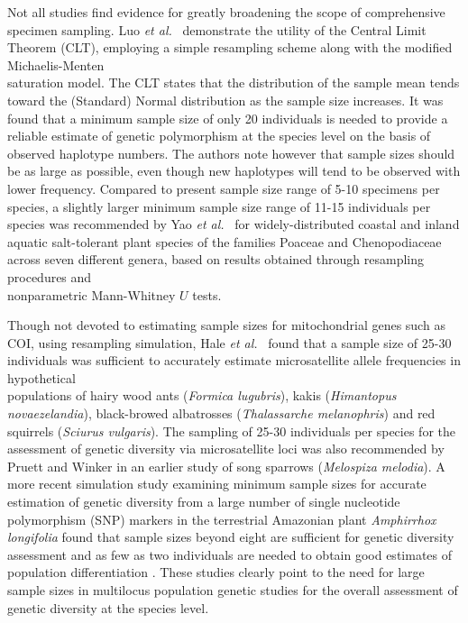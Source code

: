 Not all studies find evidence for greatly broadening the scope of comprehensive \\ specimen sampling. Luo \textit{et al.}~\cite{luo2015simulation} demonstrate the utility of the Central Limit Theorem (CLT), employing a simple resampling scheme along with the modified Michaelis-Menten \\ saturation model. The CLT states that the distribution of the sample mean tends toward the (Standard) Normal distribution as the sample size increases. It was found that a minimum sample size of only 20 individuals is needed to provide a reliable estimate of genetic polymorphism at the species level on the basis of observed haplotype numbers. The authors note however that sample sizes should be as large as possible, even though new haplotypes will tend to be observed with lower frequency. Compared to present sample size range of 5-10 specimens per species, a slightly larger minimum sample size range of 11-15 individuals per species was recommended by Yao \textit{et al.}~\cite{yao2017evaluating} for widely-distributed coastal and inland aquatic salt-tolerant plant species of the families Poaceae and Chenopodiaceae across seven different genera, based on results obtained through resampling procedures and \\ nonparametric Mann-Whitney $U$ tests.



Though not devoted to estimating sample sizes for mitochondrial genes such as COI, using resampling simulation, Hale \textit{et al.}~\cite{hale2012sampling} found that a sample size of 25-30 individuals was sufficient to accurately estimate microsatellite allele frequencies in hypothetical \\ populations of hairy wood ants (\textit{Formica lugubris}), kakis (\textit{Himantopus novaezelandia}), black-browed albatrosses (\textit{Thalassarche melanophris}) and red squirrels (\textit{Sciurus vulgaris}). The sampling of 25-30 individuals per species for the assessment of genetic diversity via microsatellite loci was also recommended by Pruett and Winker \cite{pruett2008effects} in an earlier study of song sparrows (\textit{Melospiza melodia}). A more recent simulation study examining minimum sample sizes for accurate estimation of genetic diversity from a large number of single nucleotide polymorphism (SNP) markers in the terrestrial Amazonian plant \textit{Amphirrhox longifolia} found that sample sizes beyond eight are sufficient for genetic diversity \\ assessment and as few as two individuals are needed to obtain good estimates of population differentiation \cite{nazareno2017minimum}. These studies clearly point to the need for large sample sizes in multilocus population genetic studies for the overall assessment of genetic diversity at the species level.




